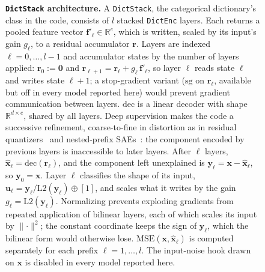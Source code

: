 \begin{figure}[tp]
\centering
\resizebox{\linewidth}{!}{}
\caption[\texttt{DictStack} architecture]{\textbf{\texttt{DictStack} architecture.}
	A \texttt{DictStack}, the categorical dictionary's class in the code,
	consists of $l$ stacked \texttt{DictEnc} layers.
	Each returns a pooled feature vector $\mathbf{f}'_\ell\in\mathbb{R}^{e}$,
	which is written, scaled by its input's gain $g_\ell$, to a residual
	accumulator $\mathbf{r}$.
	Layers are indexed $\ell = 0, \dots, l-1$ and accumulator states by the
	number of layers applied: $\mathbf{r}_0 := \mathbf{0}$ and
	$\mathbf{r}_{\ell+1} = \mathbf{r}_\ell + g_\ell\,\mathbf{f}'_\ell$, so
	layer $\ell$ reads state $\ell$ and writes state $\ell+1$; a stop-gradient
	variant ($\mathrm{sg}$ on $\mathbf{r}_\ell$, available but off in every model
	reported here) would prevent gradient communication between layers.
	$\mathrm{dec}$ is a linear decoder with shape $\mathbb{R}^{d \times e}$,
	shared by all layers.
	Deep supervision makes the code a successive refinement, coarse-to-fine
	in distortion as in residual
	quantizers~\cite{juang1982,barnes1996,zeghidour2021} and
	nested-prefix SAEs~\cite{bussmann2025}: the component encoded by
	previous layers is inaccessible to later layers.
	After $\ell$ layers, $\hat{\mathbf{x}}_\ell = \mathrm{dec}(\mathbf{r}_\ell)$, and
	the component left unexplained is
	$\mathbf{y}_\ell = \mathbf{x} - \hat{\mathbf{x}}_\ell$, so $\mathbf{y}_0 = \mathbf{x}$.
	Layer $\ell$ classifies the shape of its input,
	$\mathbf{u}_\ell
	  = \mathbf{y}_\ell / \mathrm{L2}(\mathbf{y}_\ell) \oplus [1]$, and scales
	what it writes by the gain $g_\ell = \mathrm{L2}(\mathbf{y}_\ell)$.
	Normalizing prevents exploding gradients from repeated
	application of bilinear layers, each of which scales its input by
	$\lVert\cdot\rVert^{2}$; the constant coordinate keeps the sign of
	$\mathbf{y}_\ell$, which the bilinear form would otherwise lose.
	$\mathrm{MSE}(\mathbf{x},\hat{\mathbf{x}}_\ell)$ is computed separately for
	each prefix $\ell = 1, \dots, l$. The input-noise hook drawn on $\mathbf{x}$ is disabled in
	every model reported here.
}
\label{fig:onto-stack}
\end{figure}

